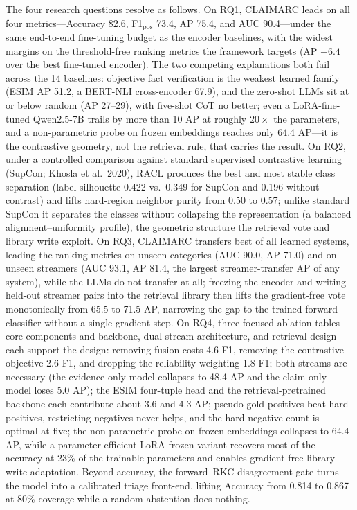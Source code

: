 \documentclass[11pt]{article}
\begin{document}
The four research questions resolve as follows. On RQ1, CLAIMARC leads on all
four metrics---Accuracy 82.6, F1$_{\text{pos}}$ 73.4, AP 75.4, and AUC
90.4---under the same end-to-end fine-tuning budget as the encoder baselines, with
the widest margins on the threshold-free ranking metrics the framework targets
(AP $+6.4$ over the best fine-tuned encoder). The two competing explanations both fail across
the 14 baselines: objective fact verification is the weakest learned family
(ESIM AP 51.2, a BERT-NLI cross-encoder 67.9), and the zero-shot LLMs sit at or
below random (AP 27--29), with five-shot CoT no better; even a LoRA-fine-tuned
Qwen2.5-7B trails by more than 10 AP at roughly $20\times$ the parameters, and a
non-parametric probe on frozen embeddings reaches only 64.4 AP---it is the
contrastive geometry, not the retrieval rule, that carries the result. On RQ2,
under a controlled comparison against standard supervised contrastive learning
(SupCon; Khosla et al.\ 2020), RACL produces the best and most stable class
separation (label silhouette 0.422 vs.\ 0.349 for SupCon and 0.196 without
contrast) and lifts hard-region neighbor purity from 0.50 to 0.57; unlike standard
SupCon it separates the classes without collapsing the representation (a balanced
alignment--uniformity profile), the geometric structure the retrieval vote and
library write exploit. On RQ3, CLAIMARC transfers best of all learned systems, leading the
ranking metrics on unseen categories (AUC 90.0, AP 71.0) and on unseen streamers
(AUC 93.1, AP 81.4, the largest streamer-transfer AP of any system), while the
LLMs do not transfer at all; freezing the encoder and writing held-out streamer
pairs into the retrieval library then lifts the gradient-free vote monotonically
from 65.5 to 71.5 AP, narrowing the gap to the trained forward classifier without
a single gradient step. On RQ4, three focused ablation tables---core components
and backbone, dual-stream architecture, and retrieval design---each
support the design: removing fusion costs 4.6 F1, removing the contrastive
objective 2.6 F1, and dropping the reliability weighting 1.8 F1; both streams are
necessary (the evidence-only model collapses to 48.4 AP and the claim-only model
loses 5.0 AP); the ESIM four-tuple head and the retrieval-pretrained backbone each
contribute about 3.6 and 4.3 AP; pseudo-gold positives beat hard positives,
restricting negatives never helps, and the hard-negative count is optimal at five;
the non-parametric probe on frozen embeddings collapses to 64.4 AP, while a
parameter-efficient LoRA-frozen variant recovers most of the accuracy at 23\% of
the trainable parameters and enables gradient-free library-write adaptation.
Beyond accuracy, the forward--RKC disagreement gate turns the model into a
calibrated triage front-end, lifting Accuracy from 0.814 to 0.867 at 80\%
coverage while a random abstention does nothing.
\end{document}
